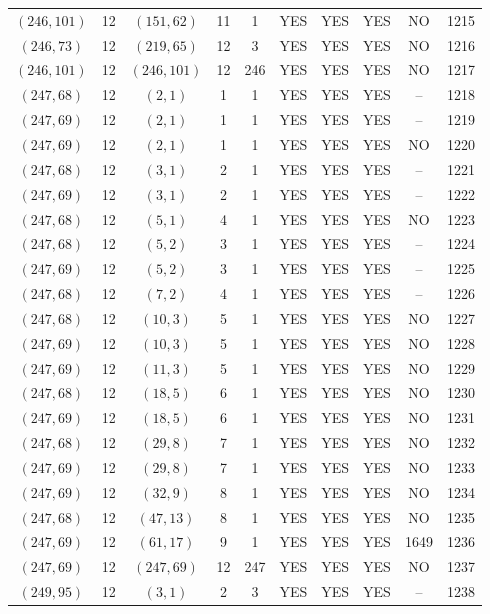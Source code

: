 \begin{longtable}{|c|c|c|c|c|c|c|c|c|c|}
$(246, 101)$ & 12 & $(151, 62)$ & 11 & 1 & YES & YES & YES & NO & 1215\\
$(246, 73)$ & 12 & $(219, 65)$ & 12 & 3 & YES & YES & YES & NO & 1216\\
$(246, 101)$ & 12 & $(246, 101)$ & 12 & 246 & YES & YES & YES & NO & 1217\\
$(247, 68)$ & 12 & $(2, 1)$ & 1 & 1 & YES & YES & YES & -- & 1218\\
$(247, 69)$ & 12 & $(2, 1)$ & 1 & 1 & YES & YES & YES & -- & 1219\\
$(247, 69)$ & 12 & $(2, 1)$ & 1 & 1 & YES & YES & YES & NO & 1220\\
$(247, 68)$ & 12 & $(3, 1)$ & 2 & 1 & YES & YES & YES & -- & 1221\\
$(247, 69)$ & 12 & $(3, 1)$ & 2 & 1 & YES & YES & YES & -- & 1222\\
$(247, 68)$ & 12 & $(5, 1)$ & 4 & 1 & YES & YES & YES & NO & 1223\\
$(247, 68)$ & 12 & $(5, 2)$ & 3 & 1 & YES & YES & YES & -- & 1224\\
$(247, 69)$ & 12 & $(5, 2)$ & 3 & 1 & YES & YES & YES & -- & 1225\\
$(247, 68)$ & 12 & $(7, 2)$ & 4 & 1 & YES & YES & YES & -- & 1226\\
$(247, 68)$ & 12 & $(10, 3)$ & 5 & 1 & YES & YES & YES & NO & 1227\\
$(247, 69)$ & 12 & $(10, 3)$ & 5 & 1 & YES & YES & YES & NO & 1228\\
$(247, 69)$ & 12 & $(11, 3)$ & 5 & 1 & YES & YES & YES & NO & 1229\\
$(247, 68)$ & 12 & $(18, 5)$ & 6 & 1 & YES & YES & YES & NO & 1230\\
$(247, 69)$ & 12 & $(18, 5)$ & 6 & 1 & YES & YES & YES & NO & 1231\\
$(247, 68)$ & 12 & $(29, 8)$ & 7 & 1 & YES & YES & YES & NO & 1232\\
$(247, 69)$ & 12 & $(29, 8)$ & 7 & 1 & YES & YES & YES & NO & 1233\\
$(247, 69)$ & 12 & $(32, 9)$ & 8 & 1 & YES & YES & YES & NO & 1234\\
$(247, 68)$ & 12 & $(47, 13)$ & 8 & 1 & YES & YES & YES & NO & 1235\\
$(247, 69)$ & 12 & $(61, 17)$ & 9 & 1 & YES & YES & YES & 1649 & 1236\\
$(247, 69)$ & 12 & $(247, 69)$ & 12 & 247 & YES & YES & YES & NO & 1237\\
$(249, 95)$ & 12 & $(3, 1)$ & 2 & 3 & YES & YES & YES & -- & 1238\\

\end{longtable}
